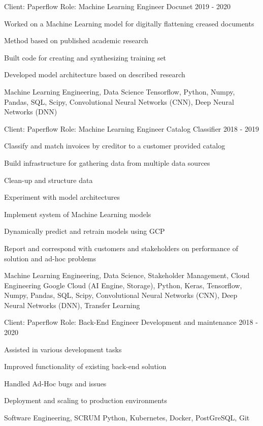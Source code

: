 \begin{cventries}
\cventry
{Client: Paperflow \newline Role: Machine Learning Engineer} %
{Docunet} %
{}%
{2019 - 2020} %
{ %
\begin{cvitems}
    \item {Worked on a Machine Learning model for digitally flattening creased documents}
    \item {Method based on published academic research}
    \item {Built code for creating and synthesizing training set}
    \item {Developed model architecture based on described research}
\end{cvitems}
\cventrykeywords
{Machine Learning Engineering, Data Science}
{Tensorflow, Python, Numpy, Pandas, SQL, Scipy, Convolutional Neural Networks (CNN), Deep Neural Networks (DNN)}
}

\cventry
{Client: Paperflow \newline Role: Machine Learning Engineer} %
{Catalog Classifier} %
{}%
{2018 - 2019} %
{ %
\begin{cvitems}
    \item {Classify and match invoices by creditor to a customer provided catalog}
    \item {Build infrastructure for gathering data from multiple data sources}
    \item {Clean-up and structure data}
    \item {Experiment with model architectures}
    \item {Implement system of Machine Learning models}
    \item {Dynamically predict and retrain models using GCP}
    \item {Report and correspond with customers and stakeholders on performance of solution and ad-hoc problems}
\end{cvitems}
\cventrykeywords
{Machine Learning Engineering, Data Science, Stakeholder Management, Cloud Engineering}
{Google Cloud (AI Engine, Storage), Python, Keras, Tensorflow, Numpy, Pandas, SQL, Scipy, Convolutional Neural Networks (CNN), Deep Neural Networks (DNN), Transfer Learning}
}

\cventry
{Client: Paperflow \newline Role: Back-End Engineer} %
{Development and maintenance} %
{}%
{2018 - 2020} %
{ %
\begin{cvitems}
    \item {Assisted in various development tasks}
    \item {Improved functionality of existing back-end solution}
    \item {Handled Ad-Hoc bugs and issues}
    \item {Deployment and scaling to production environments}
\end{cvitems}
\cventrykeywords
{Software Engineering, SCRUM}
{Python, Kubernetes, Docker, PostGreSQL, Git}
}


\end{cventries}
